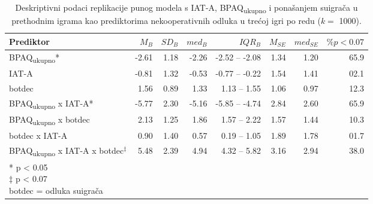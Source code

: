 \documentclass[a4paper, 12pt]{report}
\begin{document}
\begin{appendices}
\begin{table}
    \begin{center}
        \caption{\label{deskr gam3 robust} Deskriptivni podaci replikacije punog
            modela s IAT-A, BPAQ\textsubscript{ukupno} i ponašanjem suigrača u
            prethodnim igrama kao prediktorima nekooperativnih odluka u trećoj 
            igri po redu ($k =$ 1000).}
        \hspace*{-0.8cm}\begin{tabular}{lrrrrrrr}
        \toprule
        Prediktor & $M_B$ & $SD_B$ & $med_B$ & $IQR_B$ & $M_{SE}$ & $med_{SE}$
        & $\% p < 0.07$\\
        \midrule
        BPAQ\textsubscript{ukupno}* & -2.61 & 1.18 & -2.26 & -2.52 -- -2.08 &
        1.34 & 1.20 & 65.9\\
       IAT-A & -0.81 & 1.32 & -0.53 & -0.77 -- -0.22& 1.54 & 1.41 & 02.1\\
       botdec & 1.56 & 0.89 & 1.33 & 1.13 -- 1.55 & 1.06 & 0.97 & 12.3\\
       BPAQ\textsubscript{ukupno} x IAT-A* & -5.77 & 2.30 & -5.16 & -5.85 --
       -4.74& 2.84 & 2.60 & 65.9\\
       BPAQ\textsubscript{ukupno} x botdec & 2.13 & 1.25 & 1.86 &
        1.57 -- 2.22 & 1.57 & 1.44 & 10.3\\
       botdec x IAT-A & 0.90 & 1.40 & 0.57 & 0.19 -- 1.05& 1.89 & 1.78 & 01.7\\
       BPAQ\textsubscript{ukupno} x IAT-A x botdec$^\ddagger$ & 5.48 & 2.39 & 4.94 &
        4.32 -- 5.82& 3.16 & 2.94 & 38.0\\
        \bottomrule
        \multicolumn{5}{l}{
            \parbox{3cm}{\scriptsize \vspace{3pt} 
                * p < 0.05\\
                $\ddagger$  p < 0.07\\
                botdec = odluka suigrača
        }}
    \end{tabular}
\end{center}
\end{table}

\end{appendices}



{
    
}
\end{document}
